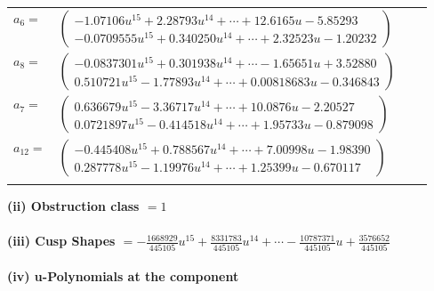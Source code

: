 \documentclass[1p]{elsarticle_modified}
\theoremstyle{definition}
\begin{document}
\begin{tabular}{m{7pt} m{180pt} m{7pt} m{180pt} }
\flushright $a_{6}=$&$\begin{pmatrix}-1.07106 u^{15}+2.28793 u^{14}+\cdots+12.6165 u-5.85293\\-0.0709555 u^{15}+0.340250 u^{14}+\cdots+2.32523 u-1.20232\end{pmatrix}$ \\
\flushright $a_{8}=$&$\begin{pmatrix}-0.0837301 u^{15}+0.301938 u^{14}+\cdots-1.65651 u+3.52880\\0.510721 u^{15}-1.77893 u^{14}+\cdots+0.00818683 u-0.346843\end{pmatrix}$ \\
\flushright $a_{7}=$&$\begin{pmatrix}0.636679 u^{15}-3.36717 u^{14}+\cdots+10.0876 u-2.20527\\0.0721897 u^{15}-0.414518 u^{14}+\cdots+1.95733 u-0.879098\end{pmatrix}$ \\
\flushright $a_{12}=$&$\begin{pmatrix}-0.445408 u^{15}+0.788567 u^{14}+\cdots+7.00998 u-1.98390\\0.287778 u^{15}-1.19976 u^{14}+\cdots+1.25399 u-0.670117\end{pmatrix}$\\&\end{tabular}
\flushleft \textbf{(ii) Obstruction class $= 1$}\\~\\
\flushleft \textbf{(iii) Cusp Shapes $= -\frac{1668929}{445105} u^{15}+\frac{8331783}{445105} u^{14}+\cdots-\frac{10787371}{445105} u+\frac{3576652}{445105}$}\\~\\
\newpage\renewcommand{\arraystretch}{1}
\flushleft \textbf{(iv) u-Polynomials at the component}\newline \\
\end{document}
